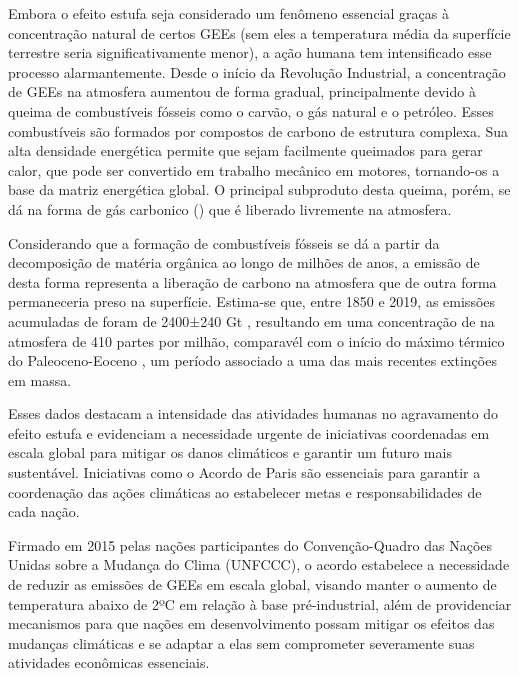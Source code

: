 Embora o efeito estufa seja considerado um fenômeno essencial graças à concentração natural de certos GEEs (sem eles a
temperatura média da superfície terrestre seria significativamente menor), a ação humana tem intensificado esse processo
alarmantemente. Desde o início da Revolução Industrial, a concentração de GEEs na atmosfera aumentou de forma gradual,
principalmente devido à queima de combustíveis fósseis como o carvão, o gás natural e o petróleo. Esses combustíveis são
formados por compostos de carbono de estrutura complexa. Sua alta densidade energética permite que sejam facilmente
queimados para gerar calor, que pode ser convertido em trabalho mecânico em motores, tornando-os a base da matriz
energética global. O principal subproduto desta queima, porém, se dá na forma de gás carbonico () que é liberado
livremente na atmosfera. 

Considerando que a formação de combustíveis fósseis se dá a partir da decomposição de matéria orgânica ao longo de
milhões de anos, a emissão de  desta forma representa a liberação de carbono na atmosfera que de outra forma
permaneceria preso na superfície. Estima-se que, entre 1850 e 2019, as emissões acumuladas de  foram de 2400±240
Gt \cite{friedlingstein}, resultando em uma concentração de  na atmosfera de 410 partes por milhão,
comparavél com o início do máximo térmico do Paleoceno-Eoceno \cite{gingerich}, um período associado a uma das mais
recentes extinções em massa.

Esses dados destacam a intensidade das atividades humanas no agravamento do efeito estufa e evidenciam a necessidade
urgente de iniciativas coordenadas em escala global para mitigar os danos climáticos e garantir um futuro mais
sustentável. Iniciativas como o Acordo de Paris são essenciais para garantir a coordenação das ações climáticas ao
estabelecer metas e responsabilidades de cada nação. 

Firmado em 2015 pelas nações participantes do Convenção-Quadro das Nações Unidas sobre a Mudança do Clima (UNFCCC), o
acordo estabelece a necessidade de reduzir as emissões de GEEs em escala global, visando manter o aumento de temperatura
abaixo de 2ºC em relação à base pré-industrial, além de providenciar mecanismos para que nações em desenvolvimento
possam mitigar os efeitos das mudanças climáticas e se adaptar a elas sem comprometer severamente suas atividades
econômicas essenciais.

